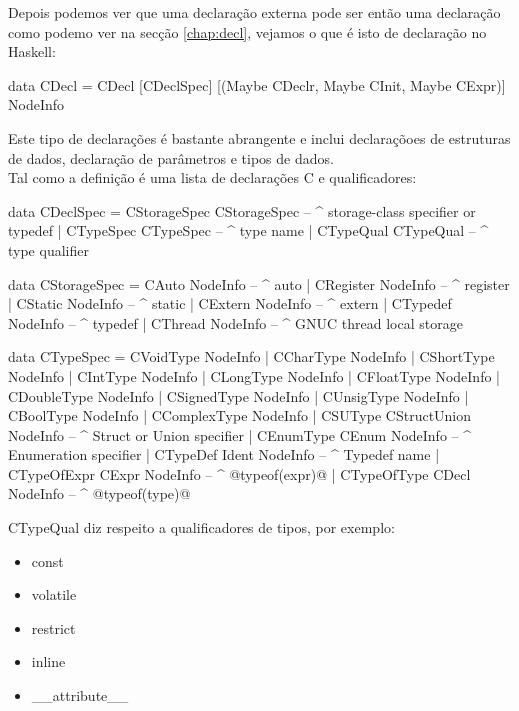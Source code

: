Depois podemos ver que uma declaração externa pode ser então uma declaração como podemo ver na secção \ref{chap:decl}, vejamos o que é isto de declaração no \textrm{Haskell}:
\begin{haskell}
data CDecl = CDecl [CDeclSpec] [(Maybe CDeclr, Maybe CInit, Maybe CExpr)] NodeInfo
\end{haskell}
Este tipo de declarações é bastante abrangente e inclui declaraçõoes de estruturas de dados, declaração de parâmetros e tipos de dados.\\

Tal como  a definição é uma lista de declarações C e qualificadores:
\begin{haskell}
data CDeclSpec = CStorageSpec CStorageSpec  -- ^ storage-class specifier or typedef
               | CTypeSpec    CTypeSpec     -- ^ type name
               | CTypeQual    CTypeQual     -- ^ type qualifier

data CStorageSpec = CAuto     NodeInfo     -- ^ auto
                  | CRegister NodeInfo     -- ^ register
                  | CStatic   NodeInfo     -- ^ static
                  | CExtern   NodeInfo     -- ^ extern
                  | CTypedef  NodeInfo     -- ^ typedef
                  | CThread   NodeInfo     -- ^ GNUC thread local storage

data CTypeSpec = CVoidType    NodeInfo
               | CCharType    NodeInfo
               | CShortType   NodeInfo
               | CIntType     NodeInfo
               | CLongType    NodeInfo
               | CFloatType   NodeInfo
               | CDoubleType  NodeInfo
               | CSignedType  NodeInfo
               | CUnsigType   NodeInfo
               | CBoolType    NodeInfo
               | CComplexType NodeInfo
               | CSUType      CStructUnion NodeInfo  -- ^ Struct or Union specifier
               | CEnumType    CEnum        NodeInfo  -- ^ Enumeration specifier
               | CTypeDef     Ident        NodeInfo  -- ^ Typedef name
               | CTypeOfExpr  CExpr        NodeInfo  -- ^ @typeof(expr)@
               | CTypeOfType  CDecl        NodeInfo  -- ^ @typeof(type)@
\end{haskell}

\textrm{CTypeQual} diz respeito a qualificadores de tipos, por exemplo:
\begin{itemize}
\item const
\item volatile
\item restrict
\item inline
\item \_\_attribute\_\_
\end{itemize}

